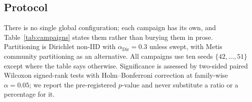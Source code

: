 \documentclass[preprint,12pt]{elsarticle}
\theoremstyle{plain}
\theoremstyle{definition}
\theoremstyle{remark}
\begin{document}
\subsection{Protocol}
\label{sec:protocol}
There is no single global configuration; each campaign has its own, and Table~\ref{tab:campaigns} states them rather than burying them in prose. Partitioning is Dirichlet non-IID with $\alpha_{\mathrm{Dir}} = 0.3$ unless swept, with Metis community partitioning as an alternative. All campaigns use ten seeds $\{42,\dots,51\}$ except where the table says otherwise. Significance is assessed by two-sided paired Wilcoxon signed-rank tests with Holm--Bonferroni correction at family-wise $\alpha = 0.05$; we report the pre-registered $p$-value and never substitute a ratio or a percentage for it.

\begin{table}[t]
\centering
\small
\caption{\textbf{Experimental campaigns.} Each row is a self-contained configuration; results from different rows are never pooled into one table.}
\label{tab:campaigns}
\end{table}
\end{document}

